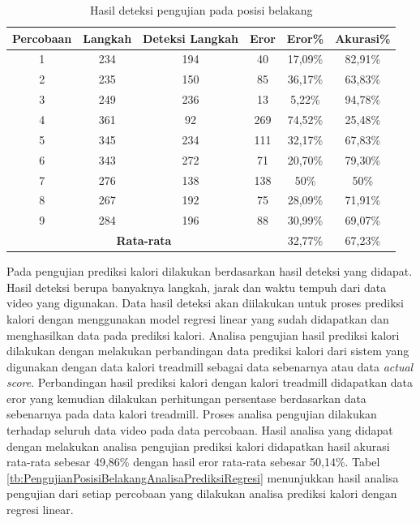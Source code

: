 \begin{longtable}{|c|c|c|c|c|c|}
  \caption{Hasil deteksi pengujian pada posisi belakang}
  \label{tb:PengujianPosisiBelakangAnalisaDeteksi}                                   \\
  \hline
  \rowcolor[HTML]{C0C0C0}
  \textbf{Percobaan} & \textbf{Langkah} & \textbf{Deteksi Langkah} & \textbf{Eror} & \textbf{Eror\%} & \textbf{Akurasi\%} \\
  \hline
  1   & 234   & 194  & 40   & 17,09\%    & 82,91\%   \\
  \hline
  2   & 235   & 150  & 85   & 36,17\%    & 63,83\%   \\
  \hline
  3   & 249   & 236  & 13   & 5,22\%     & 94,78\%   \\
  \hline
  4   & 361   & 92   & 269  & 74,52\%    & 25,48\%   \\
  \hline
  5   & 345   & 234  & 111  & 32,17\%    & 67,83\%   \\
  \hline
  6   & 343   & 272  & 71   & 20,70\%    & 79,30\%   \\
  \hline
  7   & 276   & 138  & 138  & 50\%       & 50\%   \\
  \hline
  8   & 267   & 192  & 75   & 28,09\%    & 71,91\%   \\
  \hline
  9   & 284   & 196  & 88   & 30,99\%    & 69,07\%   \\
  \hline

  \multicolumn{4}{|c|}{\textbf{Rata-rata}} & 32,77\% & 67,23\% \\
  \hline
\end{longtable}

Pada pengujian prediksi kalori dilakukan berdasarkan hasil deteksi yang didapat. Hasil deteksi berupa banyaknya langkah, jarak dan waktu tempuh dari data video yang digunakan. Data hasil deteksi akan diilakukan untuk proses prediksi kalori dengan menggunakan model regresi linear yang sudah didapatkan dan menghasilkan data pada prediksi kalori. Analisa pengujian hasil prediksi kalori dilakukan dengan melakukan perbandingan data prediksi kalori dari sistem yang digunakan dengan data kalori treadmill sebagai data sebenarnya atau data \emph{actual score}. Perbandingan hasil prediksi kalori dengan kalori treadmill didapatkan data eror yang kemudian dilakukan perhitungan persentase berdasarkan data sebenarnya pada data kalori treadmill. Proses analisa pengujian dilakukan terhadap seluruh data video pada data percobaan. Hasil analisa yang didapat dengan melakukan analisa pengujian prediksi kalori didapatkan hasil akurasi rata-rata sebesar 49,86\% dengan hasil eror rata-rata sebesar 50,14\%. Tabel \ref{tb:PengujianPosisiBelakangAnalisaPrediksiRegresi} menunjukkan hasil analisa pengujian dari setiap percobaan yang dilakukan analisa prediksi kalori dengan regresi linear.

